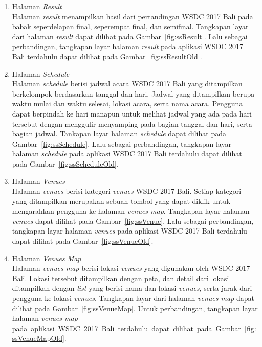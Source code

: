 \begin{enumerate}
	\item Halaman \textit{Result} \\
		Halaman \textit{result} menampilkan hasil dari pertandingan WSDC 2017 Bali pada babak seperdelapan final, seperempat final, dan semifinal. Tangkapan layar dari halaman \textit{result} dapat dilihat pada Gambar~\ref{fig:ssResult}. Lalu sebagai perbandingan, tangkapan layar halaman \textit{result} pada aplikasi WSDC 2017 Bali terdahulu dapat dilihat pada Gambar~\ref{fig:ssResultOld}.
		
	\item Halaman \textit{Schedule} \\
		Halaman \textit{schedule} berisi jadwal acara WSDC 2017 Bali yang ditampilkan berkelompok berdasarkan tanggal dan hari. Jadwal yang ditampilkan berupa waktu mulai dan waktu selesai, lokasi acara, serta nama acara. Pengguna dapat berpindah ke hari manapun untuk melihat jadwal yang ada pada hari tersebut dengan menggulir menyamping pada bagian tanggal dan hari, serta bagian jadwal. Tankapan layar halaman \textit{schedule} dapat dilihat pada Gambar~\ref{fig:ssSchedule}. Lalu sebagai perbandingan, tangkapan layar halaman \textit{schedule} pada aplikasi WSDC 2017 Bali terdahulu dapat dilihat pada Gambar~\ref{fig:ssScheduleOld}.
		
	\item Halaman \textit{Venues} \\
		Halaman \textit{venues} berisi kategori \textit{venues} WSDC 2017 Bali. Setiap kategori yang ditampilkan merupakan sebuah tombol yang dapat diklik untuk mengarahkan pengguna ke halaman \textit{venues map}. Tangkapan layar halaman \textit{venues} dapat dilihat pada Gambar~\ref{fig:ssVenue}. Lalu sebagai perbandingan, tangkapan layar halaman \textit{venues} pada aplikasi WSDC 2017 Bali terdahulu dapat dilihat pada Gambar~\ref{fig:ssVenueOld}.
		
	\item Halaman \textit{Venues Map} \\
		Halaman \textit{venues map} berisi lokasi \textit{venues} yang digunakan oleh WSDC 2017 Bali. Lokasi tersebut ditampilkan dengan peta, dan detail dari lokasi ditampilkan dengan \textit{list} yang berisi nama dan lokasi \textit{venues}, serta jarak dari pengguna ke lokasi \textit{venues}. Tangkapan layar dari halaman \textit{venues map} dapat dilihat pada Gambar~\ref{fig:ssVenueMap}. Untuk perbandingan, tangkapan layar halaman \textit{venues map} pada~aplikasi~WSDC~2017~Bali~terdahulu~dapat~dilihat~pada~Gambar~\ref{fig:ssVenueMapOld}.

	
\end{enumerate}

